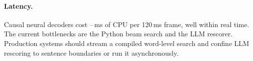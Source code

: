 \paragraph{Latency.} Causal neural decoders cost \LatConfFrame--\LatAugFrame\,ms of CPU per 120\,ms frame, well within real time. The current bottlenecks are the Python beam search and the LLM rescorer. Production systems should stream a compiled word-level search and confine LLM rescoring to sentence boundaries or run it asynchronously.
